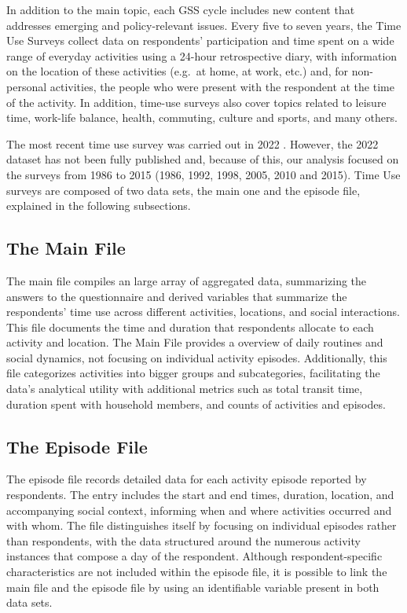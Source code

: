 \documentclass[Royal,times,sageh]{sagej}
\begin{document}
In addition to the main topic, each GSS cycle includes new content that
addresses emerging and policy-relevant issues. Every five to seven
years, the Time Use Surveys \citep{statisticscanada2022} collect data on
respondents' participation and time spent on a wide range of everyday
activities using a 24-hour retrospective diary, with information on the
location of these activities (e.g.~at home, at work, etc.) and, for
non-personal activities, the people who were present with the respondent
at the time of the activity. In addition, time-use surveys also cover
topics related to leisure time, work-life balance, health, commuting,
culture and sports, and many others.

The most recent time use survey was carried out in 2022
\citep{wray2024}. However, the 2022 dataset has not been fully published
and, because of this, our analysis focused on the surveys from 1986 to
2015 (1986, 1992, 1998, 2005, 2010 and 2015). Time Use surveys are
composed of two data sets, the main one and the episode file, explained
in the following subsections.

\subsection{The Main File}\label{the-main-file}

The main file compiles an large array of aggregated data, summarizing
the answers to the questionnaire and derived variables that summarize
the respondents' time use across different activities, locations, and
social interactions. This file documents the time and duration that
respondents allocate to each activity and location. The Main File
provides a overview of daily routines and social dynamics, not focusing
on individual activity episodes. Additionally, this file categorizes
activities into bigger groups and subcategories, facilitating the data's
analytical utility with additional metrics such as total transit time,
duration spent with household members, and counts of activities and
episodes.

\subsection{The Episode File}\label{the-episode-file}

The episode file records detailed data for each activity episode
reported by respondents. The entry includes the start and end times,
duration, location, and accompanying social context, informing when and
where activities occurred and with whom. The file distinguishes itself
by focusing on individual episodes rather than respondents, with the
data structured around the numerous activity instances that compose a
day of the respondent. Although respondent-specific characteristics are
not included within the episode file, it is possible to link the main
file and the episode file by using an identifiable variable present in
both data sets.
\end{document}
